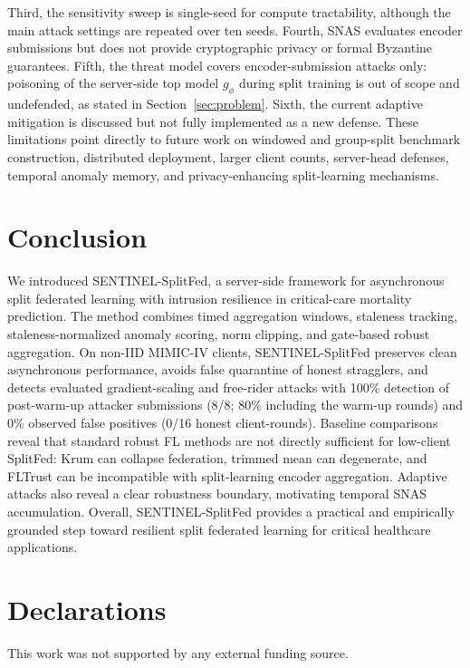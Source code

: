 \documentclass[pdflatex,sn-mathphys-num]{sn-jnl}
\begin{document}
Third, the sensitivity sweep is single-seed for compute tractability, although the main attack settings are repeated over ten seeds. Fourth, SNAS evaluates encoder submissions but does not provide cryptographic privacy or formal Byzantine guarantees. Fifth, the threat model covers encoder-submission attacks only: poisoning of the server-side top model $g_\phi$ during split training is out of scope and undefended, as stated in Section~\ref{sec:problem}. Sixth, the current adaptive mitigation is discussed but not fully implemented as a new defense. These limitations point directly to future work on windowed and group-split benchmark construction, distributed deployment, larger client counts, server-head defenses, temporal anomaly memory, and privacy-enhancing split-learning mechanisms.

\section{Conclusion}\label{sec:conclusion}

We introduced SENTINEL-SplitFed, a server-side framework for asynchronous split federated learning with intrusion resilience in critical-care mortality prediction. The method combines timed aggregation windows, staleness tracking, staleness-normalized anomaly scoring, norm clipping, and gate-based robust aggregation. On non-IID MIMIC-IV clients, SENTINEL-SplitFed preserves clean asynchronous performance, avoids false quarantine of honest stragglers, and detects evaluated gradient-scaling and free-rider attacks with 100\% detection of post-warm-up attacker submissions (8/8; 80\% including the warm-up rounds) and 0\% observed false positives (0/16 honest client-rounds). Baseline comparisons reveal that standard robust FL methods are not directly sufficient for low-client SplitFed: Krum can collapse federation, trimmed mean can degenerate, and FLTrust can be incompatible with split-learning encoder aggregation. Adaptive attacks also reveal a clear robustness boundary, motivating temporal SNAS accumulation. Overall, SENTINEL-SplitFed provides a practical and empirically grounded step toward resilient split federated learning for critical healthcare applications.

\backmatter

\section*{Declarations}

 This work was not supported by any external funding source.
\end{document}

